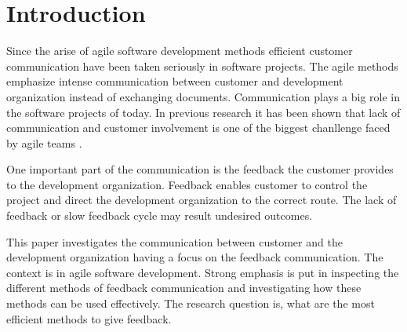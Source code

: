 \documentclass[conference]{IEEEtran}
\begin{document}




%
\IEEEpeerreviewmaketitle



\section{Introduction}



 

Since the arise of agile software development methods efficient customer communication have been taken seriously in software projects. The agile methods emphasize intense communication between customer and development organization instead of exchanging documents. Communication plays a big role in the software projects of today. In previous research it has been shown that lack of communication and customer involvement is one of the biggest chanllenge faced by agile teams \cite{2010hoda}. 

One important part of the communication is the feedback the customer provides to the development organization. Feedback enables customer to control the project and direct the development organization to the correct route. The lack of feedback or slow feedback cycle may result undesired outcomes.

This paper investigates the communication between customer and the development organization having a focus on the feedback communication. The context is in agile software development. Strong emphasis is put in inspecting the different methods of feedback communication and investigating how these methods can be used effectively. The research question is, what are the most efficient methods to give feedback.
\end{document}

